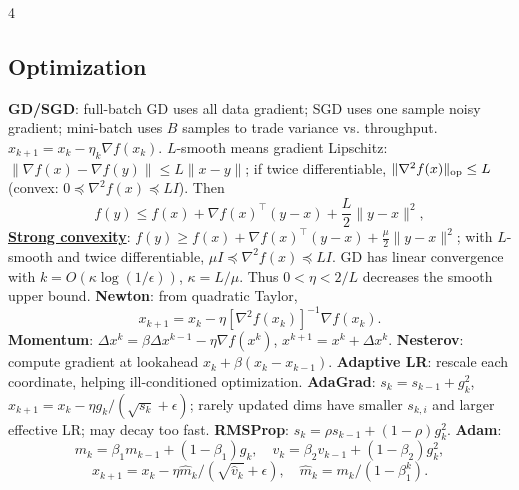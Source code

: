 \documentclass{article}
\newcommand{\key}[1]{\textbf{#1}}
\newcommand{\lowterm}[1]{\textbf{\underline{#1}}}
\newcommand{\1}{\mathbf 1}
\begin{document}
\begin{multicols*}{4}
\subsection{Optimization}
\key{GD/SGD}: full-batch GD uses all data gradient; SGD uses one sample noisy gradient; mini-batch uses $B$ samples to trade variance vs. throughput. $x_{k+1}=x_k-\eta_k\nabla f(x_k)$. $L$-smooth means gradient Lipschitz:
$\|\nabla f(x)-\nabla f(y)\|\le L\|x-y\|$; if twice differentiable, $\|\nabla^2f(x)\|_{\rm op}\le L$ (convex: $0\preceq\nabla^2f(x)\preceq LI$). Then
\[
f(y)\le f(x)+\nabla f(x)^\top(y-x)+\frac L2\|y-x\|^2,
\]
\lowterm{Strong convexity}: $f(y)\ge f(x)+\nabla f(x)^\top(y-x)+\frac\mu2\|y-x\|^2$; with $L$-smooth and twice differentiable, $\mu I\preceq\nabla^2f(x)\preceq LI$. GD has linear convergence with $k=O(\kappa\log(1/\epsilon))$, $\kappa=L/\mu$. Thus $0<\eta<2/L$ decreases the smooth upper bound. \key{Newton}: from quadratic Taylor,
\[
x_{k+1}=x_k-\eta[\nabla^2f(x_k)]^{-1}\nabla f(x_k).
\]
\key{Momentum}: $\Delta x^k=\beta\Delta x^{k-1}-\eta\nabla f(x^k)$, $x^{k+1}=x^k+\Delta x^k$. \key{Nesterov}: compute gradient at lookahead $x_k+\beta(x_k-x_{k-1})$.
\key{Adaptive LR}: rescale each coordinate, helping ill-conditioned optimization. \key{AdaGrad}: $s_k=s_{k-1}+g_k^2$, $x_{k+1}=x_k-\eta g_k/(\sqrt{s_k}+\epsilon)$; rarely updated dims have smaller $s_{k,i}$ and larger effective LR; may decay too fast. \key{RMSProp}: $s_k=\rho s_{k-1}+(1-\rho)g_k^2$. \key{Adam}:
\[
m_k=\beta_1m_{k-1}+(1-\beta_1)g_k,\quad v_k=\beta_2v_{k-1}+(1-\beta_2)g_k^2,
\]
\[
x_{k+1}=x_k-\eta\hat m_k/(\sqrt{\hat v_k}+\epsilon),\quad
\hat m_k=m_k/(1-\beta_1^k).
\]


\end{multicols*}
\end{document}
